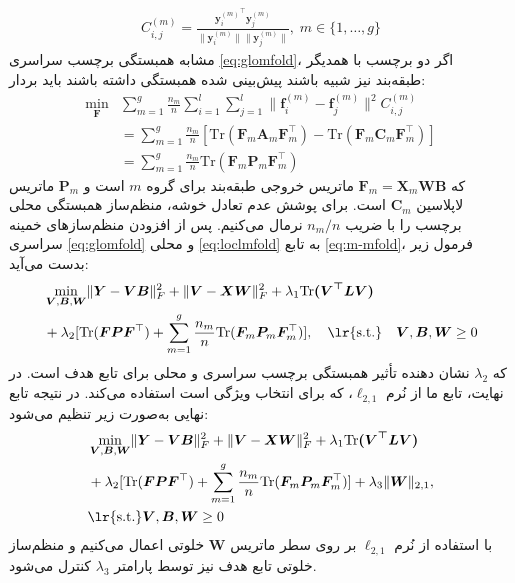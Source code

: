 \begin{align}\label{eq:llc}	
	{{{C}^{(m)}_{i,j}}=
		\frac
		{{\bm{y}^{(m)}_{i}}^\top\bm{y}^{(m)}_{j}}
		{{\lVert{\bm{y}^{(m)}_{i}}\lVert}\lVert{\bm{y}^{(m)}_{j}}\lVert}}, \; m \in  \{1,{\dots},{g}\}
\end{align}
مشابه همبستگی برچسب سراسری \eqref{eq:glomfold}، اگر دو برچسب با همدیگر همبستگی داشته باشند باید بردار ‎‎پیش‌بینی شده‎ طبقه‌بند نیز شبیه باشند:
\begin{align}\label{eq:loclmfold}
	\min_{\bm{F}}&\sum_{m=1}^{g}\frac{n_m}{n}\sum_{i=1}^{l}\sum_{j=1}^{l} \lVert{\bm{f}^{(m)}_i}-{\bm{f}^{(m)}_j}\rVert^2 {C^{(m)}_{i,j}}\nonumber \\
	&=\sum_{m=1}^{g} \frac{n_m}{n}[\mathrm{Tr}(\bm{F}_m\bm{A}_m\bm{F}_m^\top) - \mathrm{Tr}(\bm{F}_m \bm{C}_m \bm{F}_m^\top)]\nonumber \\
	&= \sum_{m=1}^{g}\frac{n_m}{n}\mathrm{Tr}(\bm{F}_m \bm{P}_m \bm{F}_m^\top)
\end{align}
که $\bm{F}_m = \bm{X}_m\bm{WB}$ ماتریس خروجی طبقه‌بند برای گروه $m$ است و $\bm{P}_m$ ماتریس لاپلاسین $\bm{C}_m$ است. برای پوشش عدم تعادل خوشه، منظم‌ساز همبستگی محلی برچسب را با ضریب ${n_m}/{n}$  نرمال می‌کنیم.
پس از افزودن منظم‌سازهای خمینه سراسری \eqref{eq:glomfold} و محلی  \eqref{eq:loclmfold} به تابع \eqref{eq:m-mfold}، فرمول زیر بدست می‌آید:
\begin{align}
	&\min_{\bm{V},\bm{B},\bm{W}}\lVert\bm{Y}-\bm{V}\bm{B}\rVert^2_F+\lVert\bm{V}-\bm{X}\bm{W}\rVert^2_F+\lambda_1{\mathrm{Tr}\bm{({V}^\top{LV})}}
	\nonumber \\&+\lambda_2[\mathrm{Tr}(\bm{FP}\bm{F}^\top) 
	+ \sum_{m=1}^{g}\frac{n_m}{n}\mathrm{Tr}(\bm{F}_m\bm{P}_m\bm{F}^\top_m) ],
	\quad{\text{\lr{s.t.}}\quad}\bm{V},\bm{B},\bm{W}\geq 0 
\end{align}
که $\lambda_2$ نشان دهنده تأثیر همبستگی برچسب سراسری و محلی برای تابع هدف است. در نهایت، تابع ما از نُرم $\ell_{2,1} $، که برای انتخاب ویژگی است استفاده می‌کند. در نتیجه تابع نهایی به‌صورت زیر تنظیم می‌شود: 
\begin{align}\label{eq:BeOpt}
	&\min_{\bm{V},\bm{B},\bm{W}}\lVert\bm{Y}-\bm{V}\bm{B}\rVert^2_F+\lVert\bm{V}-\bm{X}\bm{W}\rVert^2_F+\lambda_1{\mathrm{Tr}\bm{({V}^\top{LV})}} \nonumber \\ 
	& +\lambda_2[\mathrm{Tr}(\bm{FP}\bm{F}^\top)+\sum_{m=1}^{g}\frac{n_m}{n}\mathrm{Tr}(\bm{F}_m\bm{P}_m\bm{F}^\top_m) ]+ \lambda_3\lVert\bm{W}\rVert_{2,1},\nonumber \\ &{\text{\lr{s.t.}}}\bm{V},\bm{B},\bm{W}\geq 0 \nonumber \\
\end{align}
با استفاده از نُرم $\ell_{2,1} $ بر روی سطر ماتریس $\bm{W}$ خلوتی اعمال می‌کنیم و منظم‌ساز خلوتی تابع هدف نیز توسط پارامتر $\lambda_3$ کنترل می‌شود.

